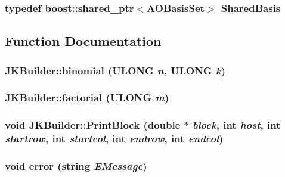 \label{namespaceJKBuilder_a5f21cc1a0cc795f1cb9aceca0400dcd0}
\hypertarget{namespaceJKBuilder_aa50d645c83645be7de5fa94937abf1f3}{
\subsubsection[{SharedBasis}]{\setlength{\rightskip}{0pt plus 5cm}typedef boost::shared\_\-ptr$<${\bf AOBasisSet}$>$ {\bf SharedBasis}}}
\label{namespaceJKBuilder_aa50d645c83645be7de5fa94937abf1f3}


\subsection{Function Documentation}
\hypertarget{namespaceJKBuilder_aa1788c8c311e8c98d9db3c6b8094570c}{
\subsubsection[{binomial}]{ JKBuilder::binomial (ULONG {\em n}, \/  ULONG {\em k})}}
\label{namespaceJKBuilder_aa1788c8c311e8c98d9db3c6b8094570c}
\hypertarget{namespaceJKBuilder_a0abd753c6677358f15ae5ef2bc41dd4f}{
\subsubsection[{factorial}]{ JKBuilder::factorial (ULONG {\em m})}}
\label{namespaceJKBuilder_a0abd753c6677358f15ae5ef2bc41dd4f}
\hypertarget{namespaceJKBuilder_aafc94332505e33cee00dd5ace182d2ee}{
\subsubsection[{PrintBlock}]{\setlength{\rightskip}{0pt plus 5cm}void JKBuilder::PrintBlock (double $\ast$ {\em block}, \/  int {\em host}, \/  int {\em startrow}, \/  int {\em startcol}, \/  int {\em endrow}, \/  int {\em endcol})}}
\label{namespaceJKBuilder_aafc94332505e33cee00dd5ace182d2ee}
\hypertarget{namespaceJKBuilder_a6935fce10a29a2d7c6ebcdb26fded20f}{
\subsubsection[{error}]{\setlength{\rightskip}{0pt plus 5cm}void {\bf error} (string {\em EMessage})}}
